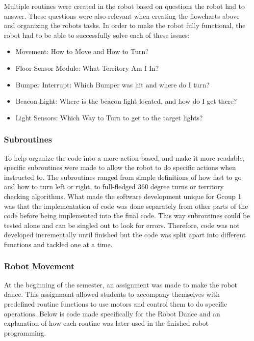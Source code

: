 \documentclass{article}
\begin{document}
    
    Multiple routines were created in the robot based on questions the robot had to answer. These questions were also relevant when creating the flowcharts above and organizing the robots tasks. In order to make the robot fully functional, the robot had to be able to successfully solve each of these issues:\\
    
    \begin{itemize}
        \item Movement: How to Move and How to Turn?
        \item Floor Sensor Module: What Territory Am I In?
        \item Bumper Interrupt: Which Bumper was hit and where do I turn?
        \item Beacon Light: Where is the beacon light located, and how do I get there?
        \item Light Sensors: Which Way to Turn to get to the target lights?
    \end{itemize}
    
    \subsubsection{Subroutines}
    To help organize the code into a more action-based, and make it more readable, specific subroutines were made to allow the robot to do specific actions when instructed to. The subroutines ranged from simple definitions of how fast to go and how to turn left or right, to full-fledged 360 degree turns or territory checking algorithms. What made the software development unique for Group 1 was that the implementation of code was done separately from other parts of the code before being implemented into the final code. This way subroutines could be tested alone and can be singled out to look for errors. Therefore, code was not developed incrementally until finished but the code was split apart into different functions and tackled one at a time.
    
    \subsubsection{Robot Movement}
    At the beginning of the semester, an assignment was made to make the robot dance. This assignment allowed students to accompany themselves with predefined routine functions to use motors and control them to do specific operations. Below is code made specifically for the Robot Dance and an explanation of how each routine was later used in the finished robot programming.
    
\end{document}
